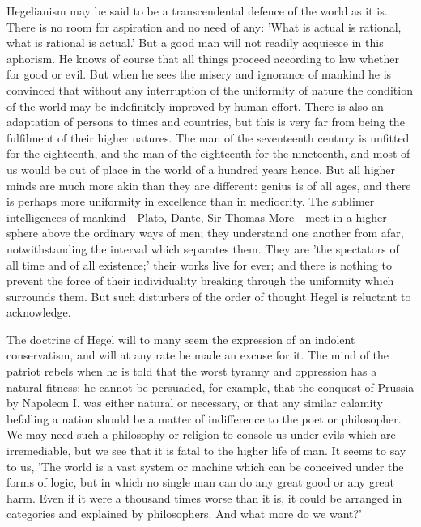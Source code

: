 \documentclass[11pt,letter]{article}
\begin{document}
\par  Hegelianism may be said to be a transcendental defence of the world as it is. There is no room for aspiration and no need of any: 'What is actual is rational, what is rational is actual.' But a good man will not readily acquiesce in this aphorism. He knows of course that all things proceed according to law whether for good or evil. But when he sees the misery and ignorance of mankind he is convinced that without any interruption of the uniformity of nature the condition of the world may be indefinitely improved by human effort. There is also an adaptation of persons to times and countries, but this is very far from being the fulfilment of their higher natures. The man of the seventeenth century is unfitted for the eighteenth, and the man of the eighteenth for the nineteenth, and most of us would be out of place in the world of a hundred years hence. But all higher minds are much more akin than they are different: genius is of all ages, and there is perhaps more uniformity in excellence than in mediocrity. The sublimer intelligences of mankind—Plato, Dante, Sir Thomas More—meet in a higher sphere above the ordinary ways of men; they understand one another from afar, notwithstanding the interval which separates them. They are 'the spectators of all time and of all existence;' their works live for ever; and there is nothing to prevent the force of their individuality breaking through the uniformity which surrounds them. But such disturbers of the order of thought Hegel is reluctant to acknowledge.

\par  The doctrine of Hegel will to many seem the expression of an indolent conservatism, and will at any rate be made an excuse for it. The mind of the patriot rebels when he is told that the worst tyranny and oppression has a natural fitness: he cannot be persuaded, for example, that the conquest of Prussia by Napoleon I. was either natural or necessary, or that any similar calamity befalling a nation should be a matter of indifference to the poet or philosopher. We may need such a philosophy or religion to console us under evils which are irremediable, but we see that it is fatal to the higher life of man. It seems to say to us, 'The world is a vast system or machine which can be conceived under the forms of logic, but in which no single man can do any great good or any great harm. Even if it were a thousand times worse than it is, it could be arranged in categories and explained by philosophers. And what more do we want?'
\end{document}
